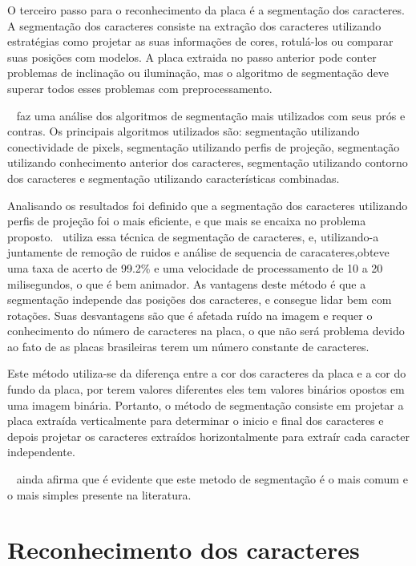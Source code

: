 O terceiro passo para o reconhecimento da placa é a segmentação dos caracteres. A segmentação dos caracteres 
consiste na extração dos caracteres utilizando estratégias como projetar as suas informações de cores, 
rotulá-los ou comparar suas posições com modelos. A placa extraida no passo anterior pode conter problemas 
de inclinação ou iluminação, mas o algoritmo de segmentação deve superar todos esses problemas com preprocessamento. ~\cite{s2013automatic}

~\cite{s2013automatic} faz uma análise dos algoritmos de segmentação mais utilizados com seus prós e contras. 
Os principais algoritmos utilizados são: segmentação utilizando conectividade de pixels, segmentação
utilizando perfis de projeção, segmentação utilizando conhecimento anterior dos caracteres, segmentação 
utilizando contorno dos caracteres e segmentação utilizando características combinadas.

Analisando os resultados foi definido que a segmentação dos caracteres utilizando perfis de projeção foi 
o mais eficiente, e que mais se encaixa no problema proposto.~\cite{sanyuan2004car} utiliza essa técnica 
de segmentação de caracteres, e, utilizando-a juntamente de remoção de ruidos e análise de sequencia de 
caracateres,obteve uma taxa de acerto de 99.2\% e uma velocidade de processamento de 10 a 20 milisegundos, 
o que é bem animador. As vantagens deste método é que a segmentação independe das posições dos caracteres, 
e consegue lidar bem com rotações. Suas desvantagens são que é afetada ruído na imagem e requer o conhecimento 
do número de caracteres na placa, o que não será problema devido ao fato de as placas brasileiras terem um 
número constante de caracteres.

Este método utiliza-se da diferença entre a cor dos caracteres da placa e a cor do fundo da placa, por 
terem valores diferentes eles tem valores binários opostos em uma imagem binária. Portanto, o método de 
segmentação consiste em projetar a placa extraída verticalmente para determinar o inicio e final dos 
caracteres e depois projetar os caracteres extraídos horizontalmente para extraír cada caracter independente.

~\cite{s2013automatic} ainda afirma que é evidente que este metodo de segmentação é o mais comum e o mais 
simples presente na literatura.

\section{Reconhecimento dos caracteres}
\label{sec:reconhecimento}
